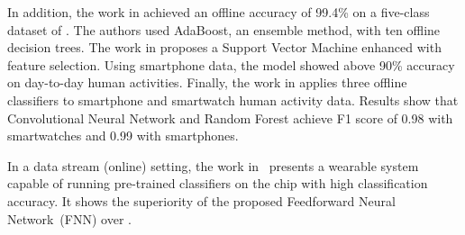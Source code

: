 In addition, the work in \cite{ugulino2012} achieved an offline accuracy of
99.4\% on a five-class dataset of \har. The authors used AdaBoost, an
ensemble method, with ten offline decision trees. The work in
\cite{ahmed2019smartphone} proposes a Support Vector Machine enhanced with
feature selection. Using smartphone data, the model showed above 90\%
accuracy on day-to-day human activities. Finally, the work in
\cite{san2018robust} applies three offline classifiers to smartphone and
smartwatch human activity data. Results show that Convolutional Neural Network and Random
Forest achieve F1 score of 0.98 with smartwatches and 0.99 with
smartphones.

In a data stream (online) setting, the work in~\cite{omid_2019} presents a wearable
system capable of running pre-trained classifiers on the chip with high classification
accuracy. It shows the superiority of the proposed Feedforward Neural
Network~(FNN) over \knn.










